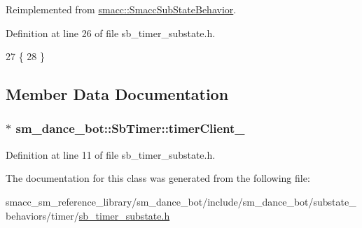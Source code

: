 Reimplemented from \hyperlink{classsmacc_1_1SmaccSubStateBehavior_afaeb44666136c5ae47a53dde89fa5d31}{smacc\+::\+Smacc\+Sub\+State\+Behavior}.



Definition at line 26 of file sb\+\_\+timer\+\_\+substate.\+h.


\begin{DoxyCode}
27   \{
28   \}
\end{DoxyCode}


\subsection{Member Data Documentation}
\subsubsection[{\texorpdfstring{timer\+Client\+\_\+}{timerClient_}}]{$\ast$ sm\+\_\+dance\+\_\+bot\+::\+Sb\+Timer\+::timer\+Client\+\_\+}\hypertarget{classsm__dance__bot_1_1SbTimer_a6e0d4c7dbb3d78b9df61761d2df4a469}{}\label{classsm__dance__bot_1_1SbTimer_a6e0d4c7dbb3d78b9df61761d2df4a469}


Definition at line 11 of file sb\+\_\+timer\+\_\+substate.\+h.



The documentation for this class was generated from the following file\+:\begin{DoxyCompactItemize}
\item 
smacc\+\_\+sm\+\_\+reference\+\_\+library/sm\+\_\+dance\+\_\+bot/include/sm\+\_\+dance\+\_\+bot/substate\+\_\+behaviors/timer/\hyperlink{sb__timer__substate_8h}{sb\+\_\+timer\+\_\+substate.\+h}\end{DoxyCompactItemize}
